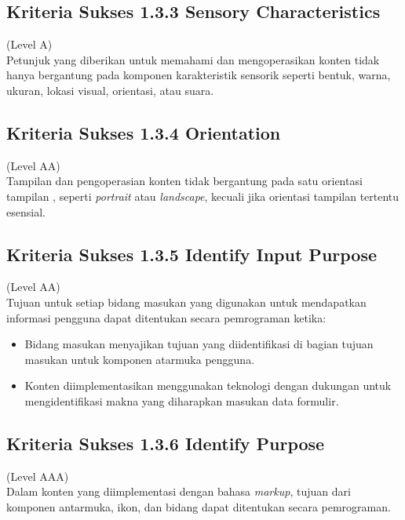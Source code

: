 \subsection{Kriteria Sukses 1.3.3 Sensory Characteristics}
\label{subsec:kriteria_1.3.3}
(Level A) \\

Petunjuk yang diberikan untuk memahami dan mengoperasikan konten tidak hanya bergantung pada komponen karakteristik sensorik seperti bentuk, warna, ukuran, lokasi visual, orientasi, atau suara.


\subsection{Kriteria Sukses 1.3.4 Orientation}
\label{subsec:kriteria_1.3.4}
(Level AA) \\

Tampilan dan pengoperasian konten tidak bergantung pada satu orientasi tampilan , seperti \textit{portrait} atau \textit{landscape}, kecuali jika orientasi tampilan tertentu esensial.


\subsection{Kriteria Sukses 1.3.5 Identify Input Purpose}
\label{subsec:kriteria_1.3.5}
(Level AA) \\
Tujuan untuk setiap bidang masukan yang digunakan untuk mendapatkan informasi pengguna dapat ditentukan secara pemrograman ketika:

\begin{itemize}
	\item Bidang masukan menyajikan tujuan yang diidentifikasi di bagian tujuan masukan untuk komponen atarmuka pengguna.
	\item Konten diimplementasikan menggunakan teknologi dengan dukungan untuk mengidentifikasi makna yang diharapkan masukan data formulir.
\end{itemize}

\subsection{Kriteria Sukses 1.3.6 Identify Purpose}
\label{subsec:kriteria_1.3.6}
(Level AAA) \\

Dalam konten yang diimplementasi dengan bahasa \textit{markup}, tujuan dari komponen antarmuka, ikon, dan bidang dapat ditentukan secara pemrograman.

